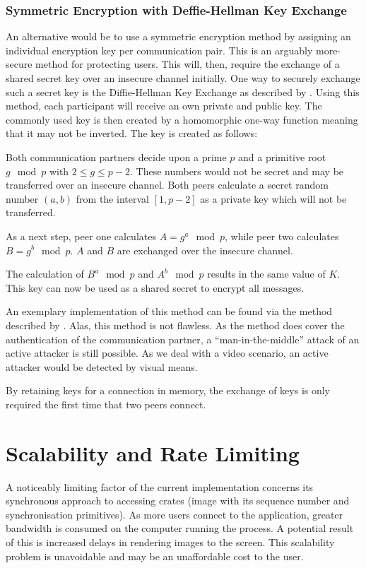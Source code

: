 \documentclass[10pt, a4paper]{article}
\begin{document}
\subsubsection{Symmetric Encryption with Deffie-Hellman Key Exchange}

An alternative would be to use a symmetric encryption method by assigning an individual encryption key per communication pair.
This is an arguably more-secure method for protecting users.
This will, then, require the exchange of a shared secret key over an insecure channel initially.
One way to securely exchange such a secret key is the Diffie-Hellman Key Exchange as described by \cite{newdirections}.
Using this method, each participant will receive an own private and public key.
The commonly used key is then created by a homomorphic one-way function meaning that it may not be inverted.
The key is created as follows:

Both communication partners decide upon a prime $p$ and a primitive root $g \mod p$ with $2 \le g \le p-2$.
These numbers would not be secret and may be transferred over an insecure channel.
Both peers calculate a secret random number $(a, b)$ from the interval $[1, p-2]$ as a private key which will not be transferred.

As a next step, peer one calculates $A = g^a \mod p$, while peer two calculates $B = g^b \mod p$.
$A$ and $B$ are exchanged over the insecure channel.

The calculation of $B^a \mod p$ and $A^b \mod p$ results in the same value of $K$.
This key can now be used as a shared secret to encrypt all messages.

An exemplary implementation of this method can be found via the method described by \cite{newdirections}.
Alas, this method is not flawless.
As the method does cover the authentication of the communication partner, a ``man-in-the-middle'' attack of an active attacker is still possible.
As we deal with a video scenario, an active attacker would be detected by visual means.

By retaining keys for a connection in memory, the exchange of keys is only required the first time that two peers connect.

\section{Scalability and Rate Limiting}

A noticeably limiting factor of the current implementation concerns its synchronous approach to accessing crates (image with its sequence number and synchronisation primitives).
As more users connect to the application, greater bandwidth is consumed on the computer running the process.
A potential result of this is increased delays in rendering images to the screen.
This scalability problem is unavoidable and may be an unaffordable cost to the user.
\end{document}
